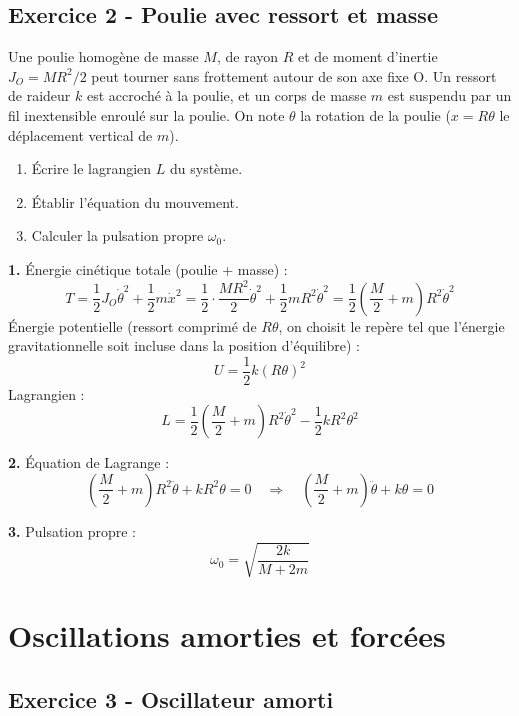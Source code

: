 \documentclass[12pt,a4paper]{article}
\begin{document}
\subsection*{Exercice 2 - Poulie avec ressort et masse \niveau{\moyen}}

\begin{boiteexercice}
Une poulie homogène de masse $M$, de rayon $R$ et de moment d'inertie $J_O = MR^2/2$ peut tourner sans frottement autour de son axe fixe O. Un ressort de raideur $k$ est accroché à la poulie, et un corps de masse $m$ est suspendu par un fil inextensible enroulé sur la poulie. On note $\theta$ la rotation de la poulie ($x = R\theta$ le déplacement vertical de $m$).
\begin{enumerate}
  \item Écrire le lagrangien $L$ du système.
  \item Établir l'équation du mouvement.
  \item Calculer la pulsation propre $\omega_0$.
\end{enumerate}
\end{boiteexercice}

\begin{boitecorrige}
\textbf{1.} Énergie cinétique totale (poulie + masse) :
\[
T = \frac{1}{2}J_O\dot\theta^2 + \frac{1}{2}m\dot x^2 = \frac{1}{2}\cdot\frac{MR^2}{2}\dot\theta^2 + \frac{1}{2}mR^2\dot\theta^2 = \frac{1}{2}\!\left(\frac{M}{2}+m\right)R^2\dot\theta^2
\]
Énergie potentielle (ressort comprimé de $R\theta$, on choisit le repère tel que l'énergie gravitationnelle soit incluse dans la position d'équilibre) :
\[
U = \frac{1}{2}k(R\theta)^2
\]
Lagrangien :
\[
L = \frac{1}{2}\!\left(\frac{M}{2}+m\right)R^2\dot\theta^2 - \frac{1}{2}kR^2\theta^2
\]

\textbf{2.} Équation de Lagrange :
\[
\left(\frac{M}{2}+m\right)R^2\ddot\theta + kR^2\theta = 0 \quad\Longrightarrow\quad \left(\frac{M}{2}+m\right)\ddot\theta + k\theta = 0
\]

\textbf{3.} Pulsation propre :
\[
\omega_0 = \sqrt{\frac{2k}{M+2m}}
\]
\end{boitecorrige}

\section{Oscillations amorties et forcées}

\subsection*{Exercice 3 - Oscillateur amorti \niveau{\moyen}}
\end{document}
